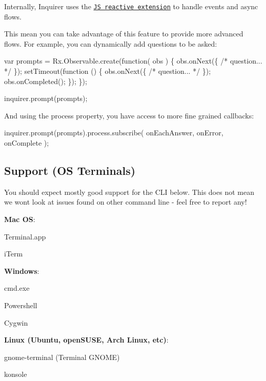 Internally, Inquirer uses the \href{https://github.com/Reactive-Extensions/RxJS}{\tt JS reactive extension} to handle events and async flows.

This mean you can take advantage of this feature to provide more advanced flows. For example, you can dynamically add questions to be asked\+:


\begin{DoxyCode}
var prompts = Rx.Observable.create(function( obs ) \{
  obs.onNext(\{ /* question... */ \});
  setTimeout(function () \{
    obs.onNext(\{ /* question... */ \});
    obs.onCompleted();
  \});
\});

inquirer.prompt(prompts);
\end{DoxyCode}


And using the {\ttfamily process} property, you have access to more fine grained callbacks\+:


\begin{DoxyCode}
inquirer.prompt(prompts).process.subscribe(
  onEachAnswer,
  onError,
  onComplete
);
\end{DoxyCode}


\subsection*{Support (OS Terminals)}

You should expect mostly good support for the C\+LI below. This does not mean we won\textquotesingle{}t look at issues found on other command line -\/ feel free to report any!


\begin{DoxyItemize}
\item {\bfseries Mac OS}\+:
\begin{DoxyItemize}
\item Terminal.\+app
\item i\+Term
\end{DoxyItemize}
\item {\bfseries Windows}\+:
\begin{DoxyItemize}
\item cmd.\+exe
\item Powershell
\item Cygwin
\end{DoxyItemize}
\item {\bfseries Linux (Ubuntu, open\+S\+U\+SE, Arch Linux, etc)}\+:
\begin{DoxyItemize}
\item gnome-\/terminal (Terminal G\+N\+O\+ME)
\item konsole
\end{DoxyItemize}
\end{DoxyItemize}

